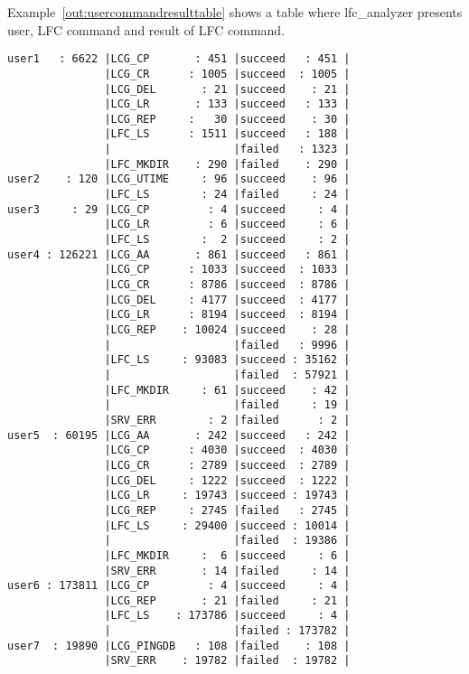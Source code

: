 \documentclass[a4paper, 11pt]{article} %
\begin{document}
\newpage

Example~\ref{out:usercommandresulttable} shows a table where lfc\_analyzer presents user, LFC command and result of LFC command.

\begin{center}
\begin{lstlisting}[style=cli, label={out:usercommandresulttable}, caption={lfc\_analyzer -i logfile -u -c -r}]
user1   : 6622 |LCG_CP       : 451 |succeed   : 451 |
               |LCG_CR      : 1005 |succeed  : 1005 |
               |LCG_DEL       : 21 |succeed    : 21 |
               |LCG_LR       : 133 |succeed   : 133 |
               |LCG_REP     :   30 |succeed    : 30 |
               |LFC_LS      : 1511 |succeed   : 188 |
               |                   |failed   : 1323 |
               |LFC_MKDIR    : 290 |failed    : 290 |
user2    : 120 |LCG_UTIME     : 96 |succeed    : 96 |
               |LFC_LS        : 24 |failed     : 24 |
user3     : 29 |LCG_CP         : 4 |succeed     : 4 |
               |LCG_LR         : 6 |succeed     : 6 |
               |LFC_LS        :  2 |succeed     : 2 |
user4 : 126221 |LCG_AA       : 861 |succeed   : 861 |
               |LCG_CP      : 1033 |succeed  : 1033 |
               |LCG_CR      : 8786 |succeed  : 8786 |
               |LCG_DEL     : 4177 |succeed  : 4177 |
               |LCG_LR      : 8194 |succeed  : 8194 |
               |LCG_REP    : 10024 |succeed    : 28 |
               |                   |failed   : 9996 |
               |LFC_LS     : 93083 |succeed : 35162 |
               |                   |failed  : 57921 |
               |LFC_MKDIR     : 61 |succeed    : 42 |
               |                   |failed     : 19 |
               |SRV_ERR        : 2 |failed      : 2 |
user5  : 60195 |LCG_AA       : 242 |succeed   : 242 |
               |LCG_CP      : 4030 |succeed  : 4030 |
               |LCG_CR      : 2789 |succeed  : 2789 |
               |LCG_DEL     : 1222 |succeed  : 1222 |
               |LCG_LR     : 19743 |succeed : 19743 |
               |LCG_REP     : 2745 |failed   : 2745 |
               |LFC_LS     : 29400 |succeed : 10014 |
               |                   |failed  : 19386 |
               |LFC_MKDIR     :  6 |succeed     : 6 |
               |SRV_ERR       : 14 |failed     : 14 |
user6 : 173811 |LCG_CP         : 4 |succeed     : 4 |
               |LCG_REP       : 21 |failed     : 21 |
               |LFC_LS    : 173786 |succeed     : 4 |
               |                   |failed : 173782 |
user7  : 19890 |LCG_PINGDB   : 108 |failed    : 108 |
               |SRV_ERR    : 19782 |failed  : 19782 |
\end{lstlisting}
\end{center}
\end{document}
